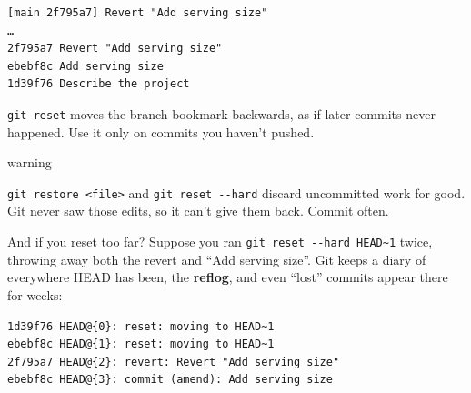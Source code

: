 \begin{codeblock}

\begin{Shaded}
\begin{Highlighting}[]
 
\end{Highlighting}
\end{Shaded}

\end{codeblock}

\begin{codeblock}
\begin{Verbatim}[formatcom=\outputstyle]
[main 2f795a7] Revert "Add serving size"
…
2f795a7 Revert "Add serving size"
ebebf8c Add serving size
1d39f76 Describe the project
\end{Verbatim}
\end{codeblock}

\texttt{git\ reset} moves the branch bookmark backwards, as if later commits never happened. Use it only on commits you haven't pushed.

\begin{callout}{warning}

\texttt{git\ restore\ \textless{}file\textgreater{}} and \texttt{git\ reset\ -\/-hard} discard uncommitted work for good. Git never saw those edits, so it can't give them back. Commit often.

\end{callout}

And if you reset too far? Suppose you ran \texttt{git\ reset\ -\/-hard\ HEAD\textasciitilde{}1} twice, throwing away both the revert and ``Add serving size''. Git keeps a diary of everywhere HEAD has been, the \textbf{reflog}, and even ``lost'' commits appear there for weeks:

\begin{codeblock}

\begin{Shaded}
\begin{Highlighting}[]
\end{Highlighting}
\end{Shaded}

\end{codeblock}

\begin{codeblock}
\begin{Verbatim}[formatcom=\outputstyle]
1d39f76 HEAD@{0}: reset: moving to HEAD~1
ebebf8c HEAD@{1}: reset: moving to HEAD~1
2f795a7 HEAD@{2}: revert: Revert "Add serving size"
ebebf8c HEAD@{3}: commit (amend): Add serving size
\end{Verbatim}
\end{codeblock}

